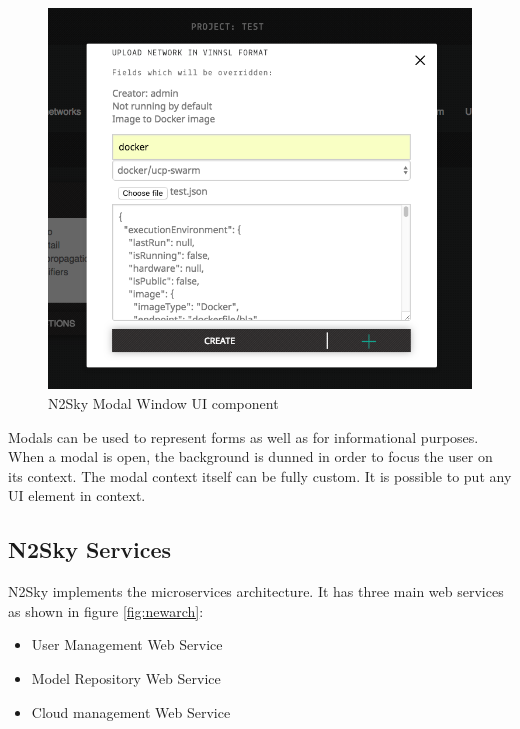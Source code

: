 \begin{description}
 \begin{figure}[H]
\begin{center}
  \includegraphics[scale=0.5]{components/3/components/modal.png}
  \caption{N2Sky Modal Window UI component}
  \label{fig:modal}
\end{center}
\end{figure}

Modals can be used to represent forms as well as for informational purposes. When a modal is open, the background is dunned in order to focus the user on its context. The modal context itself can be fully custom. It is possible to put any UI element in context.



\end{description}



\subsection{N2Sky Services}\label{N2Sky Services}

 N2Sky implements the microservices architecture. It has three main web services as shown in figure \ref{fig:newarch}:
 
\begin{itemize}
\item User Management Web Service
\item Model Repository Web Service
\item Cloud management Web Service
\end{itemize}

